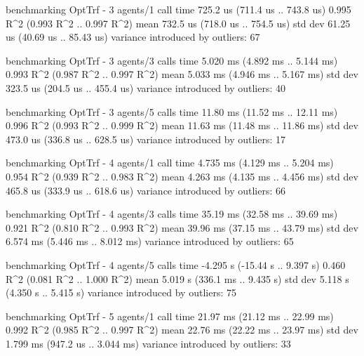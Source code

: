 \begin{showCode}
    benchmarking OptTrf - 3 agents/1 call
    time                 725.2 us   (711.4 us .. 743.8 us)
                         0.995 R^2   (0.993 R^2 .. 0.997 R^2)
    mean                 732.5 us   (718.0 us .. 754.5 us)
    std dev              61.25 us   (40.69 us .. 85.43 us)
    variance introduced by outliers: 67%

    benchmarking OptTrf - 3 agents/3 calls
    time                 5.020 ms   (4.892 ms .. 5.144 ms)
                         0.993 R^2   (0.987 R^2 .. 0.997 R^2)
    mean                 5.033 ms   (4.946 ms .. 5.167 ms)
    std dev              323.5 us   (204.5 us .. 455.4 us)
    variance introduced by outliers: 40%

    benchmarking OptTrf - 3 agents/5 calls
    time                 11.80 ms   (11.52 ms .. 12.11 ms)
                         0.996 R^2   (0.993 R^2 .. 0.999 R^2)
    mean                 11.63 ms   (11.48 ms .. 11.86 ms)
    std dev              473.0 us   (336.8 us .. 628.5 us)
    variance introduced by outliers: 17%

    benchmarking OptTrf - 4 agents/1 call
    time                 4.735 ms   (4.129 ms .. 5.204 ms)
                         0.954 R^2   (0.939 R^2 .. 0.983 R^2)
    mean                 4.263 ms   (4.135 ms .. 4.456 ms)
    std dev              465.8 us   (333.9 us .. 618.6 us)
    variance introduced by outliers: 66%

    benchmarking OptTrf - 4 agents/3 calls
    time                 35.19 ms   (32.58 ms .. 39.69 ms)
                         0.921 R^2   (0.810 R^2 .. 0.993 R^2)
    mean                 39.96 ms   (37.15 ms .. 43.79 ms)
    std dev              6.574 ms   (5.446 ms .. 8.012 ms)
    variance introduced by outliers: 65%

    benchmarking OptTrf - 4 agents/5 calls
    time                 -4.295 s   (-15.44 s .. 9.397 s)
                         0.460 R^2   (0.081 R^2 .. 1.000 R^2)
    mean                 5.019 s    (336.1 ms .. 9.435 s)
    std dev              5.118 s    (4.350 s .. 5.415 s)
    variance introduced by outliers: 75%

    benchmarking OptTrf - 5 agents/1 call
    time                 21.97 ms   (21.12 ms .. 22.99 ms)
                         0.992 R^2   (0.985 R^2 .. 0.997 R^2)
    mean                 22.76 ms   (22.22 ms .. 23.97 ms)
    std dev              1.799 ms   (947.2 us .. 3.044 ms)
    variance introduced by outliers: 33%


\end{showCode}

